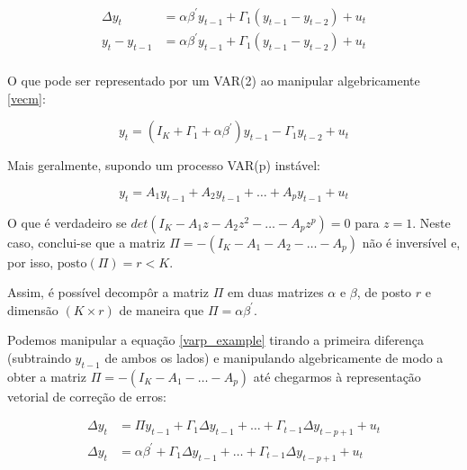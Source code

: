 \documentclass[a4paper,
               article,
               12pt,
               openany,
               oneside,
               english,
               brazil]{abntex2}
\numberwithin{equation}{section}
\begin{document}
    \begin{equation}
        \label{vecm}
        \begin{aligned}
            \Delta y_t &= \alpha \beta^{'} y_{t-1} + \Gamma_1(y_{t-1} - y_{t-2}) + u_t \\
            y_t - y_{t-1} &= \alpha \beta^{'} y_{t-1} + \Gamma_1(y_{t-1} - y_{t-2}) + u_t \\
        \end{aligned}
    \end{equation}

    O que pode ser representado por um VAR(2) ao manipular algebricamente \eqref{vecm}:

    \begin{equation}
        \label{vecm-var}
        y_t = (I_K + \Gamma_1 + \alpha \beta^{'})y_{t-1} - \Gamma_1 y_{t-2} + u_t
    \end{equation}

    Mais geralmente, supondo um processo VAR(p) instável:
    
    \begin{equation}
        \label{varp_example}
        y_t = A_1 y_{t-1} + A_2 y_{t-1} + \ldots + A_p y_{t-1} + u_t 
    \end{equation}

    O que é verdadeiro se $ det(I_K - A_1z - A_2z^2 - \ldots - A_pz^p) = 0 $ para $ z = 1 $. Neste caso, conclui-se que a matriz $ \Pi = -(I_K - A_1 - A_2 - \ldots - A_p) $ não é inversível e, por isso, $ \text{posto}(\Pi) = r < K $.
    
    Assim, é possível decompôr a matriz $ \Pi $ em duas matrizes $ \alpha $ e $ \beta $, de posto $ r $ e dimensão $ (K \times r) $ de maneira que $ \Pi = \alpha \beta^{'} $.

   Podemos manipular a equação \eqref{varp_example} tirando a primeira diferença (subtraindo $ y_{t-1} $ de ambos os lados) e manipulando algebricamente de modo a obter a matriz $ \Pi = -(I_K - A_1 - \ldots - A_p) $ até chegarmos à representação vetorial de correção de erros:

   \begin{equation}
       \label{vecm_coint}
       \begin{aligned}
           \Delta y_t &= \Pi y_{t-1} + \Gamma_1 \Delta y_{t-1} + \ldots + \Gamma_{t-1} \Delta y_{t-p+1} + u_t \\
           \Delta y_t &= \alpha \beta^{'} + \Gamma_1 \Delta y_{t-1} + \ldots + \Gamma_{t-1} \Delta y_{t-p+1} + u_t
       \end{aligned}
   \end{equation}
\end{document}
